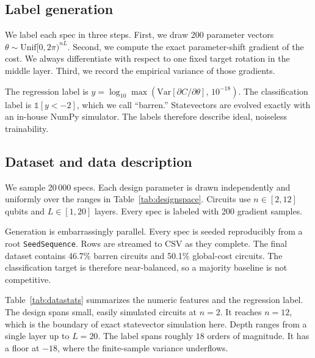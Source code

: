 \documentclass[aps,pra,preprint,amsmath,amssymb,floatfix,nofootinbib]{revtex4-2}
\newcommand{\Nrows}{20\,000}
\newcommand{\Nspecs}{20\,000}
\newcommand{\Samples}{200}
\newcommand{\QubitLo}{2}
\newcommand{\QubitHi}{12}
\newcommand{\LayerLo}{1}
\newcommand{\LayerHi}{20}
\newcommand{\GlobalFrac}{50.1}
\newcommand{\BarrenFrac}{46.7}
\begin{document}
\subsection{Label generation}
We label each spec in three steps. First, we draw \Samples{} parameter vectors
$\theta\sim\mathrm{Unif}[0,2\pi)^{nL}$. Second, we compute the exact
parameter-shift gradient of the cost. We always differentiate with respect to one
fixed target rotation in the middle layer. Third, we record the empirical
variance of those gradients.

The regression label is
$y=\log_{10}\max(\mathrm{Var}[\partial C/\partial\theta],\,10^{-18})$. The
classification label is $\mathbb{1}[y<-2]$, which we call ``barren.''
Statevectors are evolved exactly with an in-house NumPy simulator. The labels
therefore describe ideal, noiseless trainability.

\subsection{Dataset and data description}
We sample \Nspecs{} specs. Each design parameter is drawn independently and
uniformly over the ranges in Table~\ref{tab:designspace}. Circuits use
$n\in[\QubitLo,\QubitHi]$ qubits and $L\in[\LayerLo,\LayerHi]$ layers. Every spec
is labeled with \Samples{} gradient samples.

Generation is embarrassingly parallel. Every spec is seeded reproducibly from a
root \texttt{SeedSequence}. Rows are streamed to CSV as they complete. The final
dataset contains \BarrenFrac{}\% barren circuits and \GlobalFrac{}\% global-cost
circuits. The classification target is therefore near-balanced, so a majority
baseline is not competitive.

\begin{table}[t]
\caption{Sampled design space. Each spec draws these parameters independently and
uniformly.}
\label{tab:designspace}
\centering

\end{table}

Table~\ref{tab:datastats} summarizes the numeric features and the regression
label. The design spans small, easily simulated circuits at $n=2$. It reaches
$n=12$, which is the boundary of exact statevector simulation here. Depth ranges
from a single layer up to $L=20$. The label spans roughly $18$ orders of
magnitude. It has a floor at $-18$, where the finite-sample variance underflows.

\begin{table}[t]
\caption{Descriptive statistics of the numeric features and the trainability
label over all \Nrows{} circuits.}
\label{tab:datastats}
\centering

\end{table}
\end{document}
